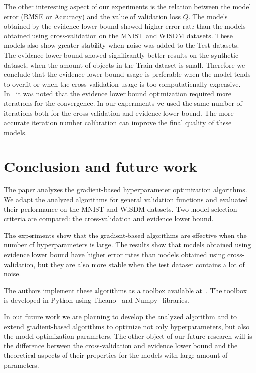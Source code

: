 \documentclass[smallcondensed]{svjour3}
\begin{document}
The other interesting aspect of our experiments is the relation between the model error (RMSE or Accuracy) and the value of validation loss $Q$. The models obtained by the evidence lower bound showed higher error rate than the models obtained using cross-validation on the MNIST and WISDM datasets. These models also show greater stability when noise was added to the Test datasets.  The evidence lower bound showed significantly better results on the synthetic dataset, when the amount of objects in the Train dataset is small. Therefore we conclude that the evidence lower bound usage is preferable when the model tends to overfit or when the cross-validation usage is too computationally expensive.   In~\cite{nips} it was noted that the evidence lower bound optimization required more iterations for the convergence. In our experiments we used the same number of iterations both for the cross-validation and evidence lower bound. The more accurate iteration number calibration can improve the final quality of these models. 

\section{Conclusion and future work}
\label{concl}
The paper analyzes the gradient-based hyperparameter optimization algorithms. We adapt the analyzed algorithms for general validation functions and evaluated their performance on the  MNIST and WISDM datasets. Two model selection criteria are compared: the cross-validation and evidence lower bound. 

The experiments show that the gradient-based algorithms are effective when the number of hyperparameters is large. The results show that models obtained using evidence lower bound have higher error rates than models obtained using cross-validation, but they are also more stable when the test dataset contains a lot of noise. 

The authors  implement these algorithms as a toolbox available at~\cite{pyfos}. The toolbox is developed in Python using Theano~\cite{theano} and Numpy~\cite{numpy} libraries. 

In out future work we are planning to develop the analyzed algorithm and to extend gradient-based algorithms to optimize not only hyperparameters, but also the model optimization parameters. The other object of our future research will is the difference between the cross-validation and evidence lower bound and the theoretical aspects of their properties for the models with large amount of parameters.


%

\end{document}
